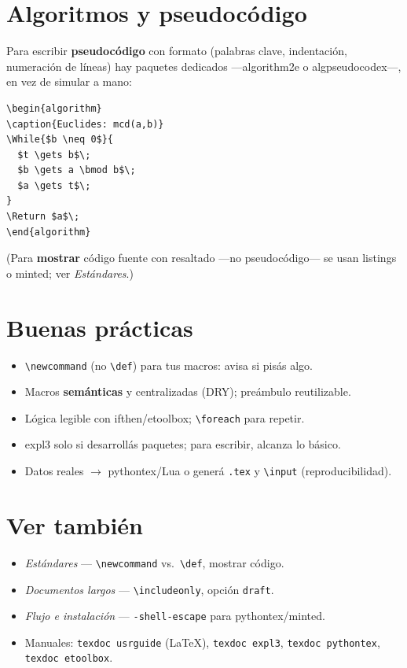 \documentclass[11pt,a4paper]{article}
\newcommand{\C}[1]{\texttt{\textbackslash #1}}
\newcommand{\pkg}[1]{\textsf{#1}}
\begin{document}
\section{Algoritmos y pseudocódigo}
Para escribir \textbf{pseudocódigo} con formato (palabras clave, indentación,
numeración de líneas) hay paquetes dedicados —\pkg{algorithm2e} o
\pkg{algpseudocodex}—, en vez de simular a mano:
\begin{lstlisting}
\begin{algorithm}
\caption{Euclides: mcd(a,b)}
\While{$b \neq 0$}{
  $t \gets b$\;
  $b \gets a \bmod b$\;
  $a \gets t$\;
}
\Return $a$\;
\end{algorithm}
\end{lstlisting}
(Para \textbf{mostrar} código fuente con resaltado —no pseudocódigo— se usan
\pkg{listings} o \pkg{minted}; ver \emph{Estándares}.)

\section{Buenas prácticas}
\begin{itemize}[noitemsep,leftmargin=*]
  \item \C{newcommand} (no \C{def}) para tus macros: avisa si pisás algo.
  \item Macros \textbf{semánticas} y centralizadas (DRY); preámbulo reutilizable.
  \item Lógica legible con \pkg{ifthen}/\pkg{etoolbox}; \C{foreach} para repetir.
  \item \pkg{expl3} solo si desarrollás paquetes; para escribir, alcanza lo básico.
  \item Datos reales $\to$ \pkg{pythontex}/Lua o generá \texttt{.tex} y
        \C{input} (reproducibilidad).
\end{itemize}

\section*{Ver también}
\begin{itemize}[noitemsep,leftmargin=*]
  \item \emph{Estándares} — \C{newcommand} vs.\ \C{def}, mostrar código.
  \item \emph{Documentos largos} — \C{includeonly}, opción \texttt{draft}.
  \item \emph{Flujo e instalación} — \texttt{-shell-escape} para pythontex/minted.
  \item Manuales: \texttt{texdoc usrguide} (LaTeX), \texttt{texdoc expl3},
        \texttt{texdoc pythontex}, \texttt{texdoc etoolbox}.
\end{itemize}
\end{document}
